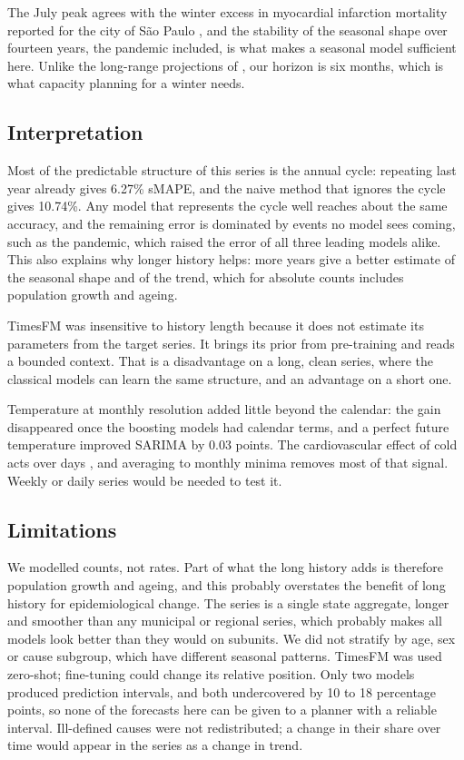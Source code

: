 The July peak agrees with the winter excess in myocardial infarction mortality reported for
the city of S\~ao Paulo \citep{sharovsky2002}, and the stability of the seasonal shape over
fourteen years, the pandemic included, is what makes a seasonal model sufficient here. Unlike the long-range projections of \citet{siqueira2020},
our horizon is six months, which is what capacity planning for a winter needs.

\subsection{Interpretation}

Most of the predictable structure of this series is the annual cycle: repeating last year
already gives 6.27\% sMAPE, and the naive method that ignores the cycle gives 10.74\%. Any
model that represents the cycle well reaches about the same accuracy, and the remaining
error is dominated by events no model sees coming, such as the pandemic, which raised the
error of all three leading models alike. This also explains why longer history helps:
more years give a better estimate of the seasonal shape and of the trend, which for
absolute counts includes population growth and ageing.

TimesFM was insensitive to history length because it does not estimate its parameters from
the target series. It brings its prior from pre-training and reads a bounded context. That
is a disadvantage on a long, clean series, where the classical models can learn the same
structure, and an advantage on a short one.

Temperature at monthly resolution added little beyond the calendar: the gain disappeared
once the boosting models had calendar terms, and a perfect future temperature improved
SARIMA by 0.03 points. The cardiovascular effect of cold acts over days \citep{analitis2008,
ferreira2019}, and averaging to monthly minima removes most of that signal. Weekly or daily
series would be needed to test it.

\subsection{Limitations}

We modelled counts, not rates. Part of what the long history adds is therefore population
growth and ageing, and this probably overstates the benefit of long history for
epidemiological change. The series is a single state aggregate, longer and smoother than
any municipal or regional series, which probably makes all models look better than they
would on subunits. We did not stratify by age, sex or cause subgroup, which have different
seasonal patterns. TimesFM was used zero-shot; fine-tuning could change its relative
position. Only two models produced prediction intervals, and both undercovered by 10 to 18
percentage points, so none of the forecasts here can be given to a planner with a
reliable interval. Ill-defined causes were not redistributed; a change in their share
over time would appear in the series as a change in trend.


